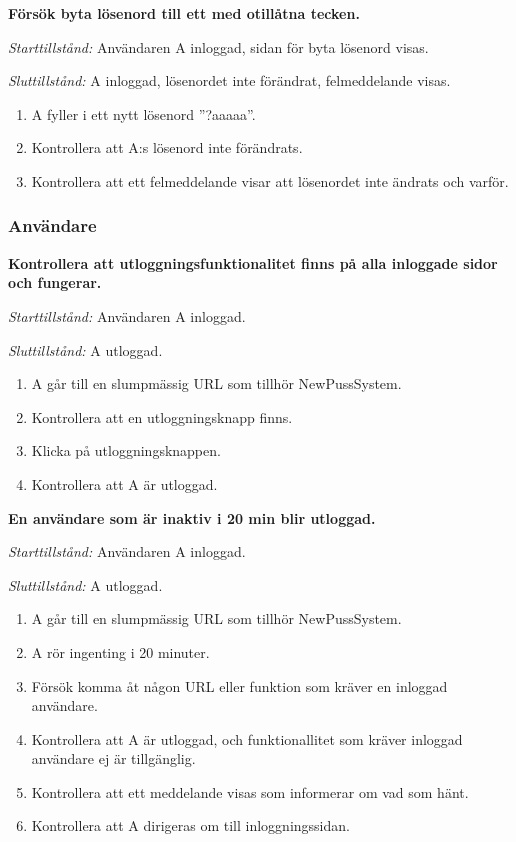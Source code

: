 \documentclass[a4paper]{article}
\begin{document}
\begin{FT}
\item
\textbf{Försök byta lösenord till ett med otillåtna tecken.}

\emph{Starttillstånd:} Användaren A inloggad, sidan för byta lösenord visas.

\emph{Sluttillstånd:} A inloggad, lösenordet inte förändrat, felmeddelande visas.

\begin{enumerate}
\item A fyller i ett nytt lösenord ''?aaaaa''.
\item Kontrollera att A:s lösenord inte förändrats.
\item Kontrollera att ett felmeddelande visar att lösenordet inte ändrats och varför.
\end{enumerate}

\end{FT}

\subsubsection{Användare}
\begin{FT}
\item
\textbf{Kontrollera att utloggningsfunktionalitet finns på alla inloggade sidor och fungerar.}

\emph{Starttillstånd:} Användaren A inloggad.

\emph{Sluttillstånd:} A utloggad.

\begin{enumerate}
\item A går till en slumpmässig URL som tillhör NewPussSystem.
\item Kontrollera att en utloggningsknapp finns.
\item Klicka på utloggningsknappen.
\item Kontrollera att A är utloggad.
\end{enumerate}

\item
\textbf{En användare som är inaktiv i 20 min blir utloggad.}

\emph{Starttillstånd:} Användaren A inloggad.

\emph{Sluttillstånd:} A utloggad.

\begin{enumerate}
\item A går till en slumpmässig URL som tillhör NewPussSystem.
\item A rör ingenting i 20 minuter.
\item Försök komma åt någon URL eller funktion som kräver en inloggad användare.
\item Kontrollera att A är utloggad, och funktionallitet som kräver inloggad användare ej är tillgänglig.
\item Kontrollera att ett meddelande visas som informerar om vad som hänt.
\item Kontrollera att A dirigeras om till inloggningssidan.
\end{enumerate}
\end{FT}
\end{document}
